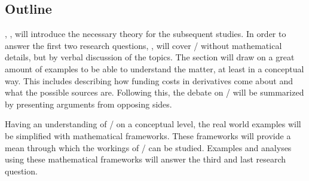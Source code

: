 \documentclass[main.tex]{subfiles}
\begin{document}
    \subsection{Outline}

    , , 
    will introduce the necessary theory for the subsequent studies.
    In order to answer the first two research questions,
    ,  
    will cover \FVA/ without mathematical details, but by verbal discussion of the topics.
    The section will draw on a great amount of examples to be able to understand the matter, 
    at least in a conceptual way.
    This includes describing how funding costs in derivatives come about 
    and what the possible sources are.
    Following this, the debate on \FVA/ will be summarized
    by presenting arguments from opposing sides.

    Having an understanding of \FVA/ on a conceptual level,
    the real world examples will be simplified with mathematical frameworks.
    These frameworks will provide a mean through which the workings of \FVA/ can be studied.
    Examples and analyses using these mathematical frameworks
    will answer the third and last research question.
\end{document}
